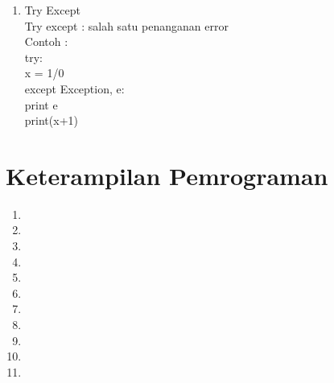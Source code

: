 \begin{enumerate}
\item Try Except\\
Try except : salah satu penanganan error\\
Contoh :\\
try:\\
	x = 1/0\\
except Exception, e:\\
	print e\\

print(x+1)
\end{enumerate}

\section{Keterampilan Pemrograman}

\begin{enumerate}

\item


\item


\item


\item


\item


\item


\item


\item


\item


\item


\item


\end{enumerate}

